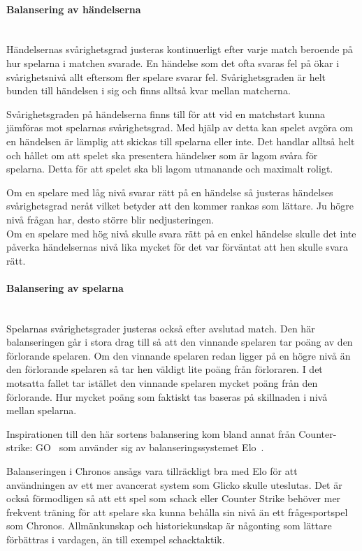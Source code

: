 \documentclass[a4paper, 11pt]{article}
\begin{document}
\paragraph{Balansering av händelserna}\mbox{}\\
Händelsernas svårighetsgrad justeras kontinuerligt efter varje match beroende på hur spelarna i matchen svarade. En händelse som det ofta svaras fel på ökar i svårighetsnivå allt eftersom fler spelare svarar fel. Svårighetsgraden är helt bunden till händelsen i sig och finns alltså kvar mellan matcherna.

Svårighetsgraden på händelserna finns till för att vid en matchstart kunna jämföras mot spelarnas svårighetsgrad. Med hjälp av detta kan spelet avgöra om en händelsen är lämplig att skickas till spelarna eller inte. Det handlar alltså helt och hållet om att spelet ska presentera händelser som är lagom svåra för spelarna. Detta för att spelet ska bli lagom utmanande och maximalt roligt.

Om en spelare med låg nivå svarar rätt på en händelse så justeras händelses svårighetsgrad neråt vilket betyder att den kommer rankas som lättare. Ju högre nivå frågan har, desto större blir nedjusteringen.\\ Om en spelare med hög nivå skulle svara rätt på en enkel händelse skulle det inte påverka händelsernas nivå lika mycket för det var förväntat att hen skulle svara rätt. 

\paragraph{Balansering av spelarna}\mbox{}\\
Spelarnas svårighetsgrader justeras också efter avslutad match. Den här balanseringen går i stora drag till så att den vinnande spelaren tar poäng av den förlorande spelaren. Om den vinnande spelaren redan ligger på en högre nivå än den förlorande spelaren så tar hen väldigt lite poäng från förloraren. I det motsatta fallet tar istället den vinnande spelaren mycket poäng från den förlorande. Hur mycket poäng som faktiskt tas baseras på skillnaden i nivå mellan spelarna. 

Inspirationen till den här sortens balansering kom bland annat från Counter-strike: GO~\cite{cs} som använder sig av balanseringssystemet Elo~\cite{elo}. 

Balanseringen i Chronos ansågs vara tillräckligt bra med Elo för att användningen av ett mer avancerat system som Glicko skulle uteslutas. Det är också förmodligen så att ett spel som schack eller Counter Strike behöver mer frekvent träning för att spelare ska kunna behålla sin nivå än ett frågesportspel som Chronos. Allmänkunskap och historiekunskap är någonting som lättare förbättras i vardagen, än till exempel schacktaktik. 
\end{document}

